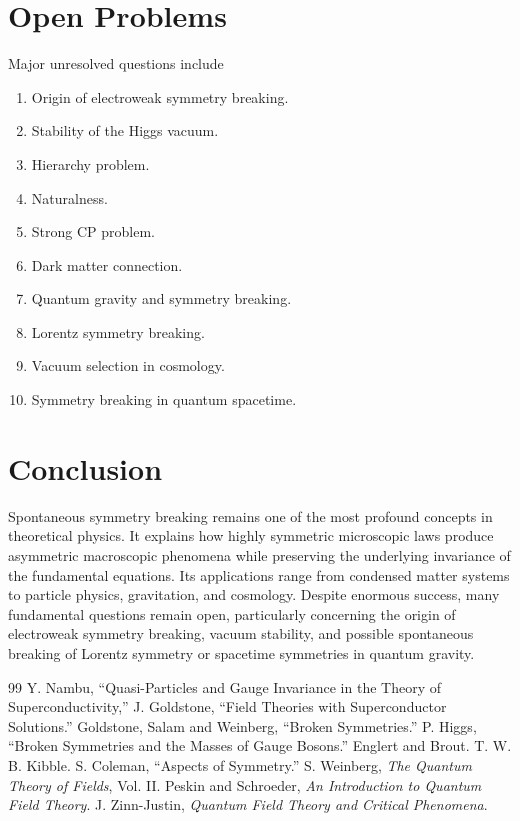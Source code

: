 \documentclass[11pt,a4paper]{article}
\begin{document}
\section{Open Problems}
Major unresolved questions include
\begin{enumerate}
\item Origin of electroweak symmetry breaking.
\item Stability of the Higgs vacuum.
\item Hierarchy problem.
\item Naturalness.
\item Strong CP problem.
\item Dark matter connection.
\item Quantum gravity and symmetry breaking.
\item Lorentz symmetry breaking.
\item Vacuum selection in cosmology.
\item Symmetry breaking in quantum spacetime.
\end{enumerate}
\section{Conclusion}
Spontaneous symmetry breaking remains one of the most profound concepts
in theoretical physics. It explains how highly symmetric microscopic
laws produce asymmetric macroscopic phenomena while preserving the
underlying invariance of the fundamental equations. Its applications
range from condensed matter systems to particle physics, gravitation,
and cosmology. Despite enormous success, many fundamental questions
remain open, particularly concerning the origin of electroweak symmetry
breaking, vacuum stability, and possible spontaneous breaking of
Lorentz symmetry or spacetime symmetries in quantum gravity.
\begin{thebibliography}{99}
Y. Nambu,
``Quasi-Particles and Gauge Invariance in the Theory of Superconductivity,''
J. Goldstone,
``Field Theories with Superconductor Solutions.''
Goldstone, Salam and Weinberg,
``Broken Symmetries.''
P. Higgs,
``Broken Symmetries and the Masses of Gauge Bosons.''
Englert and Brout.
T. W. B. Kibble.
S. Coleman,
``Aspects of Symmetry.''
S. Weinberg,
{\it The Quantum Theory of Fields},
Vol. II.
Peskin and Schroeder,
{\it An Introduction to Quantum Field Theory}.
J. Zinn-Justin,
{\it Quantum Field Theory and Critical Phenomena}.
\end{thebibliography}
\end{document}
